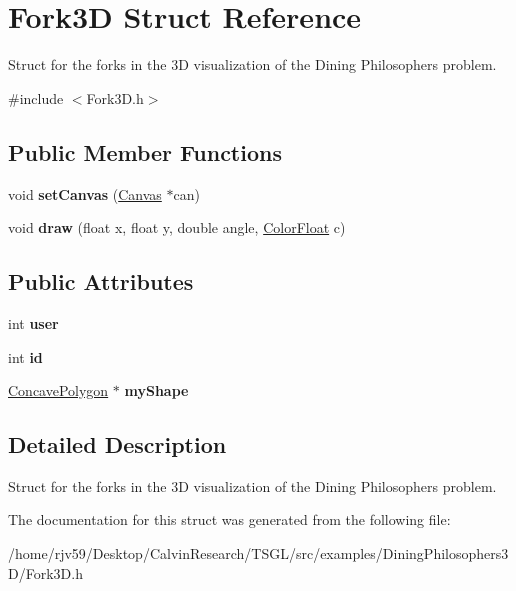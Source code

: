 \hypertarget{struct_fork3_d}{}\section{Fork3D Struct Reference}
\label{struct_fork3_d}


Struct for the forks in the 3D visualization of the Dining Philosophers\textquotesingle{} problem.  




{\ttfamily \#include $<$Fork3\+D.\+h$>$}

\subsection*{Public Member Functions}
\begin{DoxyCompactItemize}
\item 
\mbox{\label{struct_fork3_d_a2f341294fbd07eba8f81a4e5bfeb4e95}} 
void {\bfseries set\+Canvas} (\hyperlink{classtsgl_1_1_canvas}{Canvas} $\ast$can)
\item 
\mbox{\label{struct_fork3_d_aa745d8afac91a5a4ae335d8f1262ae6f}} 
void {\bfseries draw} (float x, float y, double angle, \hyperlink{structtsgl_1_1_color_float}{Color\+Float} c)
\end{DoxyCompactItemize}
\subsection*{Public Attributes}
\begin{DoxyCompactItemize}
\item 
\mbox{\label{struct_fork3_d_a2ac3101fcd371e6357fc25dcfb9ecbe3}} 
int {\bfseries user}
\item 
\mbox{\label{struct_fork3_d_abdf1bb4422ffdf7922024525aab94d67}} 
int {\bfseries id}
\item 
\mbox{\label{struct_fork3_d_a84c898115b60f9673152c88998463f60}} 
\hyperlink{classtsgl_1_1_concave_polygon}{Concave\+Polygon} $\ast$ {\bfseries my\+Shape}
\end{DoxyCompactItemize}


\subsection{Detailed Description}
Struct for the forks in the 3D visualization of the Dining Philosophers\textquotesingle{} problem. 

The documentation for this struct was generated from the following file\+:\begin{DoxyCompactItemize}
\item 
/home/rjv59/\+Desktop/\+Calvin\+Research/\+T\+S\+G\+L/src/examples/\+Dining\+Philosophers3\+D/Fork3\+D.\+h\end{DoxyCompactItemize}
